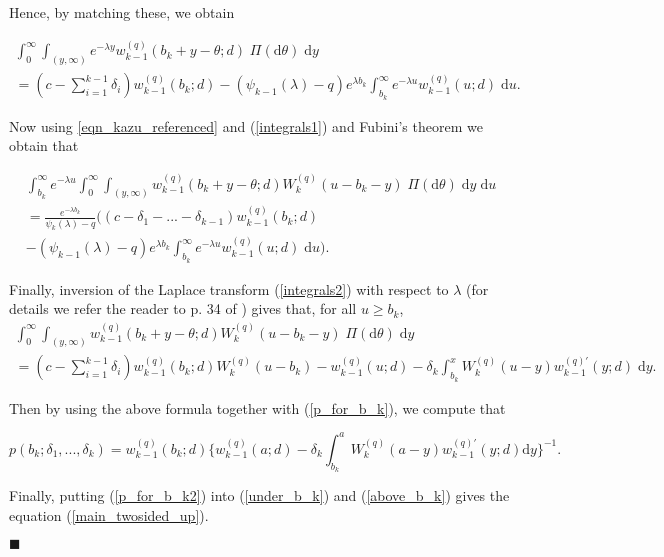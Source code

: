 \documentclass[12pt,reqno]{amsart}
\theoremstyle{definition}
\theoremstyle{remark}
\newcommand{\md}{\mathrm{d}}
\newcommand{\wq}{w^{(q)}}
\begin{document}
Hence, by matching these, we obtain 

\begin{multline} \label{integrals1}
\int_{0}^{\infty}  \int_{(y, \infty)} e^{-\lambda y} \wq_{k-1}(b_k+y-\theta;d) \;\Pi(\textrm{d}\theta)\; \textrm{d}y\\=
\left(c- \sum_{i=1}^{k-1}\delta_i\right)\wq_{k-1}(b_k;d)-\left(\psi_{k-1}(\lambda)-q\right) e^{\lambda b_k}\int_{b_k}^{\infty} e^{-\lambda u} \wq_{k-1}(u;d) \;\textrm{d}u.
\end{multline}

Now  using \eqref{eqn_kazu_referenced} and (\ref{integrals1}) and Fubini's theorem we obtain that 

\begin{eqnarray}\label{integrals2}\nonumber
\int_{b_k}^{\infty}e^{-\lambda u} \int_{0}^{\infty}\int_{(y,\infty)} \wq_{k-1}(b_k+y-\theta;d) W_k^{(q)}(u-b_k-y)\;\Pi(\textrm{d}\theta)\;\textrm{d}y \; \textrm{d}u\\\nonumber=
\frac{e^{-\lambda b_k}}{ \psi_{k}(\lambda)-q}\Big((c-\delta_1-...-\delta_{k-1}) \wq_{k-1}(b_k;d)\\-\left(\psi_{k-1}(\lambda)-q\right) 
e^{\lambda b_k}\int_{b_k}^{\infty} e^{-\lambda u} \wq_{k-1}(u;d) \;\textrm{d}u\Big). 
\end{eqnarray}

Finally, inversion of the Laplace transform (\ref{integrals2}) with respect to $\lambda$ 
(for details we refer the reader to p. 34 of \cite{kyprianouloeffen2010}) gives that, for all $u\geq b_k$,
\begin{multline}\label{integrals3}
 \int_{0}^{\infty}\int_{(y,\infty)} \wq_{k-1}(b_k+y-\theta;d) W_k^{(q)}(u-b_k-y)\;\Pi(\textrm{d}\theta)\;\textrm{d}y \\=
\left(c-\sum_{i=1}^{k-1} \delta_i\right) \wq_{k-1}(b_k;d)  W_k^{(q)}(u-b_k) - \wq_{k-1}(u;d)
-\delta_k \int^{x}_{b_{k}}W_k^{\left(q\right)}(u-y)w_{k-1}^{\left(q\right)'}(y;d)\;\md y.
\end{multline}

Then by using the above formula together with (\ref{p_for_b_k}), we compute that 

\begin{equation}\label{p_for_b_k2}
 p(b_k;\delta_1,...,\delta_k)=\wq_{k-1}(b_k;d)\Big\{
 \wq_{k-1}(a;d) -\delta_k \int^{a}_{b_{k}}W_k^{\left(q\right)}(a-y)w_{k-1}^{\left(q\right)'}(y;d)\md y\Big\}^{-1}.
\end{equation}

Finally, putting  (\ref{p_for_b_k2}) into (\ref{under_b_k}) and (\ref{above_b_k}) gives the equation (\ref{main_twosided_up}).  
\begin{flushright}$\blacksquare$\end{flushright}
\end{document}
